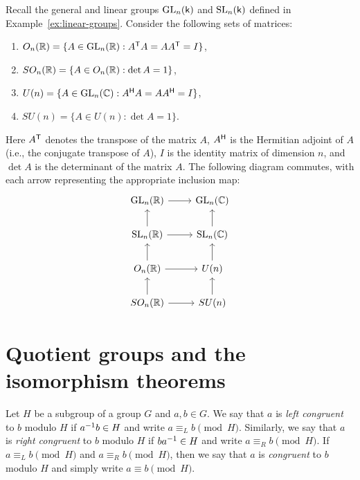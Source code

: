 \begin{example}
    \label{ex:subgroups-GLn-SLn}
    Recall the general and linear groups \(\operatorname{GL}_n(\mathsf{k})\) and
    \(\operatorname{SL}_n(\mathsf{k})\) defined in Example~\ref{ex:linear-groups}. Consider
    the following sets of matrices:
    \begin{enumerate}[label=(\alph*)]
        \item \(O_n(\mathbb{R}) = \{A \in \operatorname{GL}_n(\mathbb{R}) : A^{\mathsf{T}} A = AA^{\mathsf{T}} = I\}\),
        \item \(SO_n(\mathbb{R}) = \{A \in O_n(\mathbb{R}) : \det A = 1\}\),
        \item \(U(n) = \{A \in \operatorname{GL}_n(\mathbb{C}) : A^{\mathsf{H}} A = AA^{\mathsf{H}} = I\}\),
        \item \(SU(n) = \{A \in U(n) : \det A = 1\}\).
    \end{enumerate}
    Here \(A^{\mathsf{T}}\) denotes the transpose of the matrix \(A\), \(A^{\mathsf{H}}\) is
    the Hermitian adjoint of \(A\) (i.e., the conjugate transpose of \(A\)),
    \(I\) is the identity matrix of dimension \(n\), and \(\det A\) is the
    determinant of the matrix \(A\). The following diagram commutes, with each
    arrow representing the appropriate inclusion map:
    \[
        \begin{tikzcd}
            \GL_n(\R) \arrow[r]           & \GL_n(\C)           \\
            \SL_n(\R) \arrow[r] \arrow[u] & \SL_n(\C) \arrow[u] \\
            O_n(\R) \arrow[r] \arrow[u]   & U(n) \arrow[u]      \\
            SO_n(\R) \arrow[r] \arrow[u]  & SU(n) \arrow[u]    
        \end{tikzcd}
    \]
    
\end{example}

\section{Quotient groups and the isomorphism theorems}
\label{sec:quotient-groups}

\begin{definition}
    Let \(H\) be a subgroup of a group \(G\) and \(a, b \in G\). We say that
    \(a\) is \emph{left congruent} to \(b\) modulo \(H\) if \(a^{-1} b \in H\)
    and write \(a \equiv_L b \pmod{H}\). Similarly, we say that \(a\) is
    \emph{right congruent} to \(b\) modulo \(H\) if \(ba^{-1} \in H\) and write
    \(a \equiv_R b \pmod{H}\). If \(a \equiv_L b \pmod{H}\) and \(a \equiv_R b
    \pmod{H}\), then we say that \(a\) is \emph{congruent} to \(b\) modulo \(H\)
    and simply write \(a \equiv b \pmod{H}\).
\end{definition}

